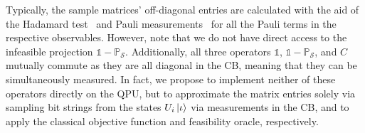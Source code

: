 \documentclass[10pt,conference]{IEEEtran}
\newcommand*{\solspace}{\mathcal{S}}  %
\newcommand*{\one}{\mathds{1}}        %
\newcommand*{\projection}{\mathds{P}} %
\begin{document}
Typically, the sample matrices' off-diagonal entries are calculated with the aid of the Hadamard test~\cite{Ekert2002DirectEstimationsOfLinearAndNonlinearFunctionalsOfAQuantumState} and Pauli measurements~\cite{Bharti2021IterativeQuantumAssistedEigensolver} for all the Pauli terms in the respective observables.
However, note that we do not have direct access to the infeasible projection $\one - \projection_{\solspace}$.
Additionally, all three operators $\one$, $\one - \projection_{\solspace}$, and $C$ mutually commute as they are all diagonal in the CB, meaning that they can be simultaneously measured.
In fact, we propose to implement neither of these operators directly on the QPU, but to approximate the matrix entries solely via sampling bit strings from the states $U_{i} \ket{\iota}$ via measurements in the CB, and to apply the classical objective function and feasibility oracle, respectively.
\end{document}
